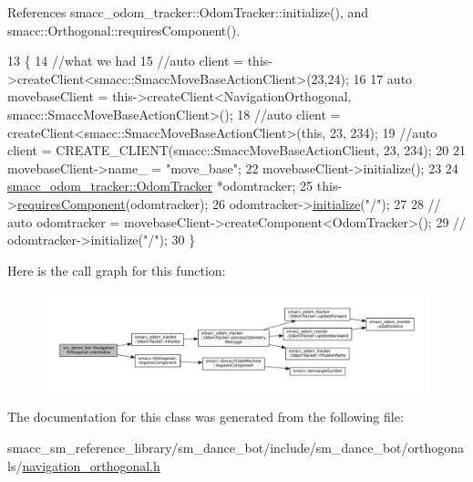 References smacc\+\_\+odom\+\_\+tracker\+::\+Odom\+Tracker\+::initialize(), and smacc\+::\+Orthogonal\+::requires\+Component().


\begin{DoxyCode}
13     \{
14         \textcolor{comment}{//what we had}
15         \textcolor{comment}{//auto client = this->createClient<smacc::SmaccMoveBaseActionClient>(23,24);}
16 
17         \textcolor{keyword}{auto} movebaseClient = this->createClient<NavigationOrthogonal, smacc::SmaccMoveBaseActionClient>();
18         \textcolor{comment}{//auto client = createClient<smacc::SmaccMoveBaseActionClient>(this, 23, 234);}
19         \textcolor{comment}{//auto client = CREATE\_CLIENT(smacc::SmaccMoveBaseActionClient, 23, 234);}
20 
21         movebaseClient->name\_ = \textcolor{stringliteral}{"move\_base"};
22         movebaseClient->initialize();
23 
24         \hyperlink{classsmacc__odom__tracker_1_1OdomTracker}{smacc\_odom\_tracker::OdomTracker} *odomtracker;
25         this->\hyperlink{classsmacc_1_1Orthogonal_a098b5be0f89d0911afc44c10b756ef2a}{requiresComponent}(odomtracker);
26         odomtracker->\hyperlink{classsmacc__odom__tracker_1_1OdomTracker_a4b3ff3f659474cb7bdd6b4b54dcc0a53}{initialize}(\textcolor{stringliteral}{"/"});
27 
28         \textcolor{comment}{// auto odomtracker = movebaseClient->createComponent<OdomTracker>();}
29         \textcolor{comment}{// odomtracker->initialize("/");}
30     \}
\end{DoxyCode}


Here is the call graph for this function\+:
\nopagebreak
\begin{figure}[H]
\begin{center}
\leavevmode
\includegraphics[width=350pt]{classsm__dance__bot_1_1NavigationOrthogonal_a2087b378406e35f0c7e6e31f21d37958_cgraph}
\end{center}
\end{figure}




The documentation for this class was generated from the following file\+:\begin{DoxyCompactItemize}
\item 
smacc\+\_\+sm\+\_\+reference\+\_\+library/sm\+\_\+dance\+\_\+bot/include/sm\+\_\+dance\+\_\+bot/orthogonals/\hyperlink{smacc__sm__reference__library_2sm__dance__bot_2include_2sm__dance__bot_2orthogonals_2navigation__orthogonal_8h}{navigation\+\_\+orthogonal.\+h}\end{DoxyCompactItemize}

